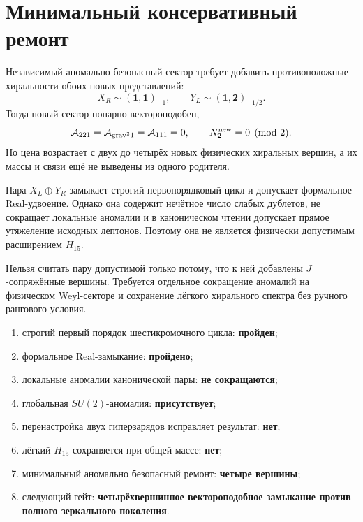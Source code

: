 \section{Минимальный консервативный ремонт}

Независимый аномально безопасный сектор требует добавить противоположные
хиральности обоих новых представлений:
\begin{equation}
 X_R\sim(\mathbf1,\mathbf1)_{-1},\qquad
 Y_L\sim(\mathbf1,\mathbf2)_{-1/2}.
 \label{eq:v7-mirror-pair-vectorlike-repair}
\end{equation}
Тогда новый сектор попарно вектороподобен,
\begin{equation}
 \mathcal A_{221}=\mathcal A_{\mathrm{grav}^2 1}
 =\mathcal A_{111}=0,
 \qquad N_{\mathbf2}^{\rm new}=0\pmod2.
 \label{eq:v7-mirror-pair-repair-anomalies}
\end{equation}
Но цена возрастает с двух до четырёх новых физических хиральных вершин, а
их массы и связи ещё не выведены из одного родителя.

\begin{theorem}
Пара $X_L\oplus Y_R$ замыкает строгий первопорядковый цикл и допускает
формальное Real-удвоение. Однако она содержит нечётное число слабых дублетов,
не сокращает локальные аномалии и в каноническом чтении допускает прямое
утяжеление исходных лептонов. Поэтому она не является физически допустимым
расширением $H_{15}$.
\end{theorem}

\begin{nogocriterion}
Нельзя считать пару допустимой только потому, что к ней добавлены
$J$-сопряжённые вершины. Требуется отдельное сокращение аномалий на физическом
Weyl-секторе и сохранение лёгкого хирального спектра без ручного рангового
условия.
\end{nogocriterion}

\begin{protocol}
\begin{enumerate}
 \item строгий первый порядок шестикромочного цикла: \textbf{пройден};
 \item формальное Real-замыкание: \textbf{пройдено};
 \item локальные аномалии канонической пары: \textbf{не сокращаются};
 \item глобальная $SU(2)$-аномалия: \textbf{присутствует};
 \item перенастройка двух гиперзарядов исправляет результат: \textbf{нет};
 \item лёгкий $H_{15}$ сохраняется при общей массе: \textbf{нет};
 \item минимальный аномально безопасный ремонт: \textbf{четыре вершины};
 \item следующий гейт: \textbf{четырёхвершинное вектороподобное замыкание
 против полного зеркального поколения}.
\end{enumerate}
\end{protocol}

